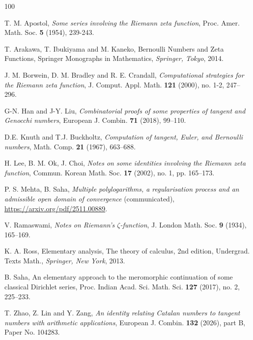 \documentclass[12pt]{amsart}
\begin{document}
\begin{thebibliography}{100}

T. M. Apostol, {\it Some series involving the Riemann zeta function}, Proc. Amer. Math. Soc.
{\bf 5} (1954), 239-243.

T. Arakawa, T. Ibukiyama and M. Kaneko, {Bernoulli Numbers and Zeta Functions}, Springer Monographs in Mathematics, {\it Springer, Tokyo}, 2014.

J. M. Borwein, D. M. Bradley and R. E. Crandall,
{\it Computational strategies for the Riemann zeta function}, J. Comput. Appl. Math. {\bf 121} (2000), no. 1-2, 247--296.

G-N. Han and  J-Y. Liu,
{\it Combinatorial proofs of some properties of tangent and Genocchi numbers},
European J. Combin. {\bf 71} (2018), 99--110.

D.E. Knuth and T.J. Buckholtz, 
{\it Computation of tangent, Euler, and Bernoulli numbers},
Math. Comp. {\bf 21} (1967), 663--688.


H. Lee, B. M. Ok, J. Choi, {\it Notes on some identities involving the Riemann zeta function}, Commun. Korean Math. Soc. {\bf 17} (2002), no. 1, pp. 165--173.

P. S. Mehta, B. Saha, {\it Multiple polylogarithms, a regularisation process and an admissible open domain of convergence} (communicated),
\href{https://arxiv.org/pdf/2511.00889}{https://arxiv.org/pdf/2511.00889}.


V. Ramaswami, {\it Notes on Riemann's $\zeta$-function}, J. London Math. Soc. {\bf 9} (1934), 165--169.

K. A. Ross, Elementary analysis, The theory of calculus, 2nd edition, Undergrad. Texts Math., {\it Springer, New York}, 2013.

B. Saha, An elementary approach to the meromorphic continuation of some classical Dirichlet series,
Proc. Indian Acad. Sci. Math. Sci. {\bf 127} (2017), no. 2, 225--233.

T. Zhao, Z. Lin and Y. Zang,
{\it An identity relating Catalan numbers to tangent numbers with arithmetic applications},
European J. Combin. {\bf 132} (2026), part B, Paper No. 104283.



\end{thebibliography}

 
\end{document}
